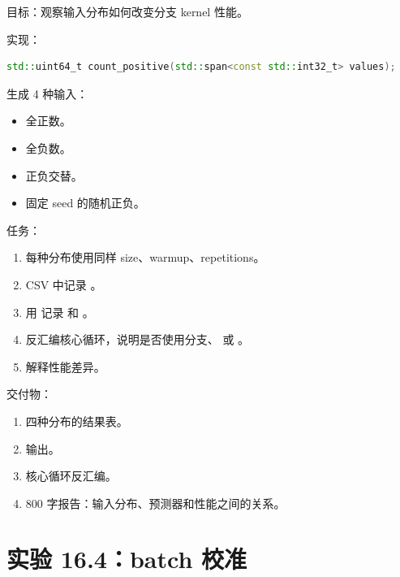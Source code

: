 \begin{labbox}
目标：观察输入分布如何改变分支 kernel 性能。

实现：

\begin{lstlisting}[language=C++]
std::uint64_t count_positive(std::span<const std::int32_t> values);
\end{lstlisting}

生成 4 种输入：

\begin{itemize}
  \item 全正数。
  \item 全负数。
  \item 正负交替。
  \item 固定 seed 的随机正负。
\end{itemize}

任务：

\begin{enumerate}
  \item 每种分布使用同样 size、warmup、repetitions。
  \item CSV 中记录 。
  \item 用  记录  和 。
  \item 反汇编核心循环，说明是否使用分支、 或 。
  \item 解释性能差异。
\end{enumerate}

交付物：

\begin{enumerate}
  \item 四种分布的结果表。
  \item {} 输出。
  \item 核心循环反汇编。
  \item 800 字报告：输入分布、预测器和性能之间的关系。
\end{enumerate}
\end{labbox}

\section{实验 16.4：batch 校准}

